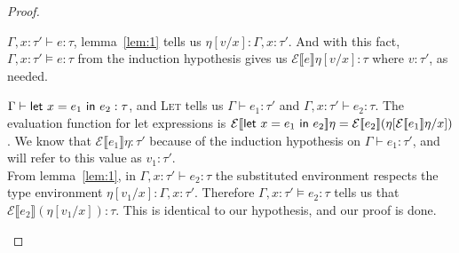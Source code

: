 \begin{proof}
\begin{description}
    $\Gamma, x : \tau' \vdash e : \tau$, lemma~\ref{lem:1} tells us $\eta[v/x] : \Gamma,x : \tau'$.
    And with this fact, $\Gamma,x : \tau' \vDash e : \tau$ from the
    induction hypothesis gives us $\mathcal{E} \llbracket e \rrbracket \eta [v/x] : \tau$
    where $v : \tau'$, as needed.
  \item[\boxed{\letin{x = e_1}{e_2}}] $\Gamma \vdash \mathsf{let} \ x = e_1 \ \mathsf{in} \ e_2 : \tau$, and
    \textsc{Let} tells us $\Gamma \vdash e_1 : \tau'$ and $\Gamma,x : \tau' \vdash e_2 : \tau$. The
    evaluation function for let expressions is
    ${\mathcal{E} [\![ \mathsf{let} \ x = e_1 \ \mathsf{in} \ e_2 ]\!] \eta
    = \mathcal{E} [\![ e_2 ]\!] (\eta [\mathcal{E} [\![ e_1 ]\!] \eta / x ])}$. We know that
  $\mathcal{E} \llbracket e_1 \rrbracket \eta : \tau'$ because of the induction hypothesis on
  $\Gamma \vdash e_1 : \tau'$, and will refer to this value as $v_1 : \tau'$. \\
  From lemma~\ref{lem:1}, in $\Gamma,x : \tau' \vdash e_2 : \tau$ the substituted environment
  respects the type environment $\eta[v_1/x] : \Gamma,x : \tau'$.
  Therefore $\Gamma,x : \tau' \vDash e_2 : \tau$ tells us that
  $\mathcal{E} \llbracket e_2 \rrbracket (\eta [v_1/x]) : \tau$. This is
  identical to our hypothesis, and our proof is done.
  \end{description}
  
\end{proof}



